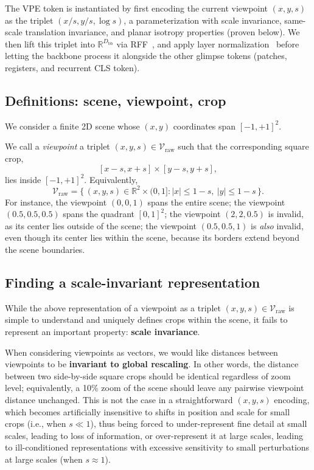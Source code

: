 \documentclass{article}
\begin{document}
The VPE token is instantiated by first encoding the current viewpoint $(x, y, s)$ as the triplet $(x/s, y/s, \log s)$, a parameterization with scale invariance, same-scale translation invariance, and planar isotropy properties (proven below). We then lift this triplet into $\mathbb{R}^{D_{\mathrm{bb}}}$ via \ac{RFF}~\cite{tancikFourierFeaturesLet2020}, and apply layer normalization~\cite{baLayerNormalization2016} before letting the backbone process it alongside the other glimpse tokens (patches, registers, and recurrent CLS token).

\subsection{Definitions: scene, viewpoint, crop}

We consider a finite 2D scene whose $(x,y)$ coordinates span $[-1,+1]^2$.

We call a \emph{viewpoint} a triplet $(x,y,s) \in \mathcal{V}_{\mathrm{raw}}$ such that the corresponding square crop,
\[
[x-s, x+s] \times [y-s, y+s],
\]
lies inside $[-1,+1]^2$. Equivalently,
\[
\mathcal{V}_{\mathrm{raw}} = \{\, (x,y,s) \in \mathbb{R}^2 \times (0,1] : |x| \le 1 - s,\ |y| \le 1 - s \,\}.
\]
For instance, the viewpoint $(0,0,1)$ spans the entire scene; the viewpoint $(0.5,0.5,0.5)$ spans the quadrant $[0,1]^2$; the viewpoint $(2, 2, 0.5)$ is invalid, as its center lies outside of the scene; the viewpoint $(0.5, 0.5, 1)$ is \emph{also} invalid, even though its center lies within the scene, because its borders extend beyond the scene boundaries.

\subsection{Finding a scale-invariant representation}

While the above representation of a viewpoint as a triplet $(x,y,s) \in \mathcal{V}_{\mathrm{raw}}$ is simple to understand and uniquely defines crops within the scene, it fails to represent an important property: \textbf{scale invariance}.

When considering viewpoints as vectors, we would like distances between viewpoints to be \textbf{invariant to global rescaling}. In other words, the distance between two side-by-side square crops should be identical regardless of zoom level; equivalently, a 10\% zoom of the scene should leave any pairwise viewpoint distance unchanged. This is not the case in a straightforward $(x,y,s)$ encoding, which becomes artificially insensitive to shifts in position and scale for small crops (i.e., when $s \ll 1$), thus being forced to under-represent fine detail at small scales, leading to loss of information, or over-represent it at large scales, leading to ill-conditioned representations with excessive sensitivity to small perturbations at large scales (when $s \approx 1$).
\end{document}
